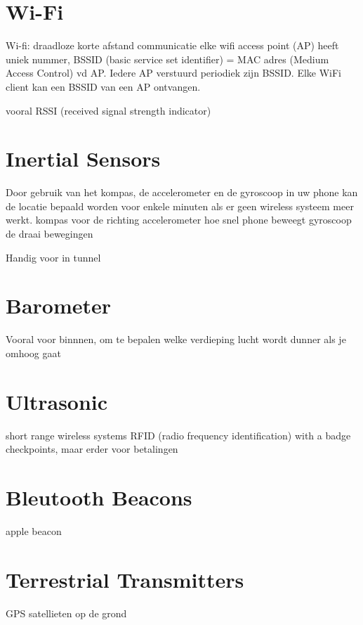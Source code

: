 \section{Wi-Fi}
Wi-fi: draadloze korte afstand communicatie
elke wifi access point (AP) heeft uniek nummer, BSSID (basic service set identifier) = MAC adres (Medium Access Control) vd AP. Iedere AP verstuurd periodiek zijn BSSID. Elke WiFi client kan een BSSID van een AP ontvangen.

vooral RSSI (received signal strength indicator)




\section{Inertial Sensors}
Door gebruik van het kompas, de accelerometer en de gyroscoop in uw phone kan de locatie bepaald worden voor enkele minuten als er geen wireless systeem meer werkt.
kompas voor de richting
accelerometer hoe snel phone beweegt
gyroscoop de draai bewegingen



Handig voor in tunnel



\section{Barometer}
Vooral voor binnnen, om te bepalen welke verdieping
lucht wordt dunner als je omhoog gaat


\section{Ultrasonic}
short range wireless systems
RFID (radio frequency identification) with a badge
checkpoints, maar erder voor betalingen




\section{Bleutooth Beacons}
apple beacon

\section{Terrestrial Transmitters}
GPS satellieten op de grond





\iffalse
- GPS 55
- GLONASS 56
- Galileo 57
- Beidou/compass 58

- Cellulair 59
- Televisie 60
- Infrarood 61
- RFID 64
- Ultrasound 67
- short range wireless 69
	- Wi-fi 70
	- Bleutooth 72
	- UWB 75
	- Zigbee 76
	
 Some GPS receivers may use additional clues or assumptions such as reusing the last known altitude, dead reckoning, inertial navigation, or including information from the vehicle computer, to give a (possibly degraded) position when fewer than four satellites are visible.

\fi

